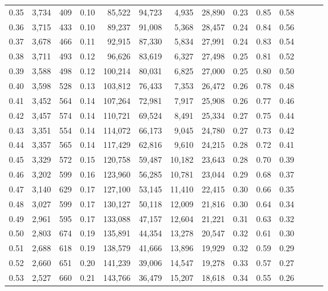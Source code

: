 \begin{tabular}{rrrrrrrrrrrrrr}
0.35 &  3,734 &  409 &  0.10 &   85,522 &   94,723 &   4,935 &  28,890 &  0.23 &  0.85 &      0.58 \\
0.36 &  3,715 &  433 &  0.10 &   89,237 &   91,008 &   5,368 &  28,457 &  0.24 &  0.84 &      0.56 \\
0.37 &  3,678 &  466 &  0.11 &   92,915 &   87,330 &   5,834 &  27,991 &  0.24 &  0.83 &      0.54 \\
0.38 &  3,711 &  493 &  0.12 &   96,626 &   83,619 &   6,327 &  27,498 &  0.25 &  0.81 &      0.52 \\
0.39 &  3,588 &  498 &  0.12 &  100,214 &   80,031 &   6,825 &  27,000 &  0.25 &  0.80 &      0.50 \\
0.40 &  3,598 &  528 &  0.13 &  103,812 &   76,433 &   7,353 &  26,472 &  0.26 &  0.78 &      0.48 \\
0.41 &  3,452 &  564 &  0.14 &  107,264 &   72,981 &   7,917 &  25,908 &  0.26 &  0.77 &      0.46 \\
0.42 &  3,457 &  574 &  0.14 &  110,721 &   69,524 &   8,491 &  25,334 &  0.27 &  0.75 &      0.44 \\
0.43 &  3,351 &  554 &  0.14 &  114,072 &   66,173 &   9,045 &  24,780 &  0.27 &  0.73 &      0.42 \\
0.44 &  3,357 &  565 &  0.14 &  117,429 &   62,816 &   9,610 &  24,215 &  0.28 &  0.72 &      0.41 \\
0.45 &  3,329 &  572 &  0.15 &  120,758 &   59,487 &  10,182 &  23,643 &  0.28 &  0.70 &      0.39 \\
0.46 &  3,202 &  599 &  0.16 &  123,960 &   56,285 &  10,781 &  23,044 &  0.29 &  0.68 &      0.37 \\
0.47 &  3,140 &  629 &  0.17 &  127,100 &   53,145 &  11,410 &  22,415 &  0.30 &  0.66 &      0.35 \\
0.48 &  3,027 &  599 &  0.17 &  130,127 &   50,118 &  12,009 &  21,816 &  0.30 &  0.64 &      0.34 \\
0.49 &  2,961 &  595 &  0.17 &  133,088 &   47,157 &  12,604 &  21,221 &  0.31 &  0.63 &      0.32 \\
0.50 &  2,803 &  674 &  0.19 &  135,891 &   44,354 &  13,278 &  20,547 &  0.32 &  0.61 &      0.30 \\
0.51 &  2,688 &  618 &  0.19 &  138,579 &   41,666 &  13,896 &  19,929 &  0.32 &  0.59 &      0.29 \\
0.52 &  2,660 &  651 &  0.20 &  141,239 &   39,006 &  14,547 &  19,278 &  0.33 &  0.57 &      0.27 \\
0.53 &  2,527 &  660 &  0.21 &  143,766 &   36,479 &  15,207 &  18,618 &  0.34 &  0.55 &      0.26 \\

\end{tabular}
